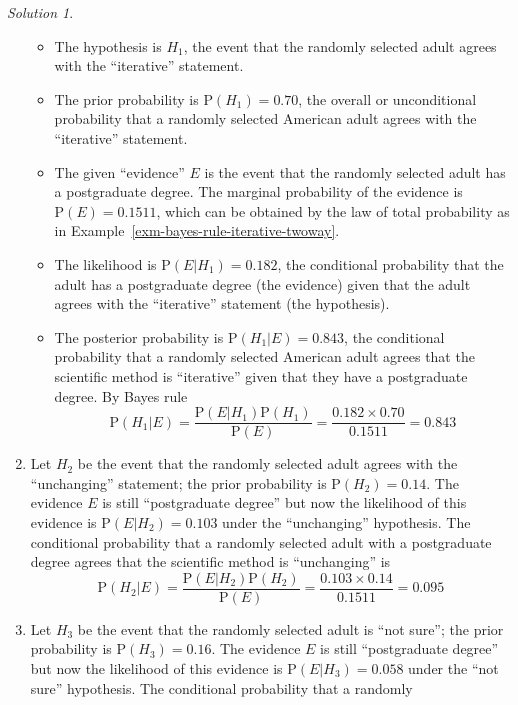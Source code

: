 \documentclass[
  letterpaper,
  DIV=11,
  numbers=noendperiod]{scrreprt}
\providecommand{\tightlist}{%
  \setlength{\itemsep}{0pt}\setlength{\parskip}{0pt}}
\theoremstyle{plain}
\theoremstyle{definition}
\theoremstyle{definition}
\theoremstyle{definition}
\theoremstyle{remark}
\newtheorem{refsolution}{Solution}[chapter]
\begin{document}
\begin{tcolorbox}
\begin{refsolution}
\begin{enumerate}
  \begin{itemize}
  \tightlist
  \item
    The hypothesis is \(H_1\), the event that the randomly selected
    adult agrees with the ``iterative'' statement.
  \item
    The prior probability is \(\textrm{P}(H_1) = 0.70\), the overall or
    unconditional probability that a randomly selected American adult
    agrees with the ``iterative'' statement.
  \item
    The given ``evidence'' \(E\) is the event that the randomly selected
    adult has a postgraduate degree. The marginal probability of the
    evidence is \(\textrm{P}(E)=0.1511\), which can be obtained by the
    law of total probability as in
    Example~\ref{exm-bayes-rule-iterative-twoway}.
  \item
    The likelihood is \(\textrm{P}(E | H_1) = 0.182\), the conditional
    probability that the adult has a postgraduate degree (the evidence)
    given that the adult agrees with the ``iterative'' statement (the
    hypothesis).
  \item
    The posterior probability is \(\textrm{P}(H_1 |E)=0.843\), the
    conditional probability that a randomly selected American adult
    agrees that the scientific method is ``iterative'' given that they
    have a postgraduate degree. By Bayes rule \[
    \textrm{P}(H_1 | E) = \frac{\textrm{P}(E | H_1) \textrm{P}(H_1)}{\textrm{P}(E)} = \frac{0.182 \times 0.70}{0.1511} = 0.843
    \]
  \end{itemize}
\item
  Let \(H_2\) be the event that the randomly selected adult agrees with
  the ``unchanging'' statement; the prior probability is
  \(\textrm{P}(H_2) = 0.14\). The evidence \(E\) is still ``postgraduate
  degree'' but now the likelihood of this evidence is
  \(\textrm{P}(E | H_2) = 0.103\) under the ``unchanging'' hypothesis.
  The conditional probability that a randomly selected adult with a
  postgraduate degree agrees that the scientific method is
  ``unchanging'' is \[
  \textrm{P}(H_2 | E) = \frac{\textrm{P}(E | H_2) \textrm{P}(H_2)}{\textrm{P}(E)} = \frac{0.103 \times 0.14}{0.1511} = 0.095
  \]
\item
  Let \(H_3\) be the event that the randomly selected adult is ``not
  sure''; the prior probability is \(\textrm{P}(H_3) = 0.16\). The
  evidence \(E\) is still ``postgraduate degree'' but now the likelihood
  of this evidence is \(\textrm{P}(E | H_3) = 0.058\) under the ``not
  sure'' hypothesis. The conditional probability that a randomly

\end{enumerate}
\end{refsolution}
\end{tcolorbox}
\end{document}
